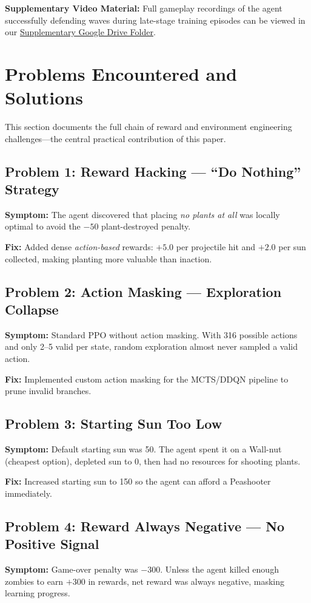 \documentclass[conference]{IEEEtran}
\begin{document}
\textbf{Supplementary Video Material:} Full gameplay recordings of the agent successfully defending waves during late-stage training episodes can be viewed in our \href{INSERT_YOUR_GOOGLE_DRIVE_LINK_HERE}{Supplementary Google Drive Folder}.

\section{Problems Encountered and Solutions}

This section documents the full chain of reward and environment engineering challenges---the central practical contribution of this paper.

\subsection{Problem 1: Reward Hacking --- ``Do Nothing'' Strategy}
\textbf{Symptom:} The agent discovered that placing \emph{no plants at all} was locally optimal to avoid the $-50$ plant-destroyed penalty. 

\textbf{Fix:} Added dense \emph{action-based} rewards: $+5.0$ per projectile hit and $+2.0$ per sun collected, making planting more valuable than inaction.

\subsection{Problem 2: Action Masking --- Exploration Collapse}
\textbf{Symptom:} Standard PPO without action masking. With 316 possible actions and only 2--5 valid per state, random exploration almost never sampled a valid action.

\textbf{Fix:} Implemented custom action masking for the MCTS/DDQN pipeline to prune invalid branches.

\subsection{Problem 3: Starting Sun Too Low}
\textbf{Symptom:} Default starting sun was 50. The agent spent it on a Wall-nut (cheapest option), depleted sun to 0, then had no resources for shooting plants. 

\textbf{Fix:} Increased starting sun to 150 so the agent can afford a Peashooter immediately.

\subsection{Problem 4: Reward Always Negative --- No Positive Signal}
\textbf{Symptom:} Game-over penalty was $-300$. Unless the agent killed enough zombies to earn $+300$ in rewards, net reward was always negative, masking learning progress.
\end{document}
